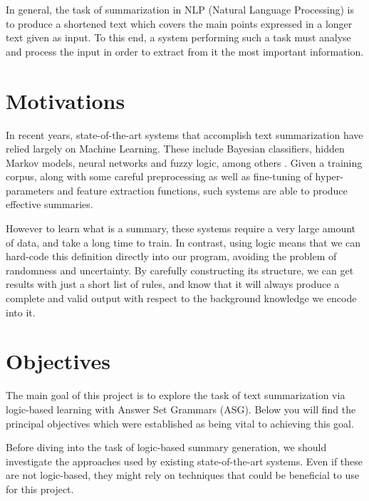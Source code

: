 \label{chapter:introduction}

In general, the task of summarization in NLP (Natural Language Processing) is to produce a shortened text which covers the main points expressed in a longer text given as input. To this end, a system performing such a task must analyse and process the input in order to extract from it the most important information.

\section{Motivations}

In recent years, state-of-the-art systems that accomplish text summarization have relied largely on Machine Learning. These include Bayesian classifiers, hidden Markov models, neural networks and fuzzy logic, among others \cite{kiyani_survey_2017}. Given a training corpus, along with some careful preprocessing as well as fine-tuning of hyper-parameters and feature extraction functions, such systems are able to produce effective summaries. 

However to learn what is a summary, these systems require a very large amount of data, and take a long time to train. In contrast, using logic means that we can hard-code this definition directly into our program, avoiding the problem of randomness and uncertainty. By carefully constructing its structure, we can get results with just a short list of rules, and know that it will always produce a complete and valid output with respect to the background knowledge we encode into it.

\section{Objectives}

The main goal of this project is to explore the task of text summarization via logic-based learning with Answer Set Grammars (ASG). Below you will find the principal objectives which were established as being vital to achieving this goal.

\begin{objective}
Before diving into the task of logic-based summary generation, we should investigate the approaches used by existing state-of-the-art systems. Even if these are not logic-based, they might rely on techniques that could be beneficial to use for this project.
\end{objective}

